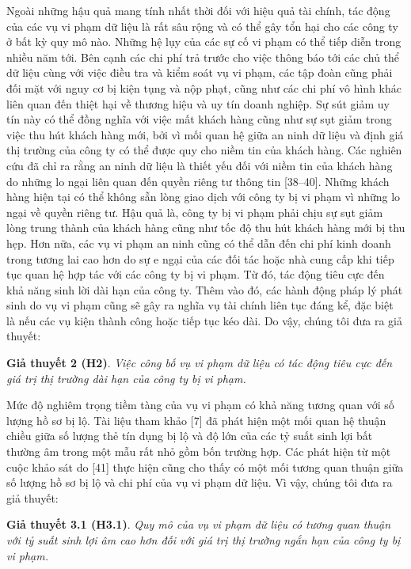Ngoài những hậu quả mang tính nhất thời đối với hiệu quả tài chính, tác động của các vụ vi phạm dữ liệu là rất sâu rộng và có thể gây tổn hại cho các công ty ở bất kỳ quy mô nào. Những hệ lụy của các sự cố vi phạm có thể tiếp diễn trong nhiều năm tới. Bên cạnh các chi phí trả trước cho việc thông báo tới các chủ thể dữ liệu cùng với việc điều tra và kiểm soát vụ vi phạm, các tập đoàn cũng phải đối mặt với nguy cơ bị kiện tụng và nộp phạt, cũng như các chi phí vô hình khác liên quan đến thiệt hại về thương hiệu và uy tín doanh nghiệp. Sự sút giảm uy tín này có thể đồng nghĩa với việc mất khách hàng cũng như sự sụt giảm trong việc thu hút khách hàng mới, bởi vì mối quan hệ giữa an ninh dữ liệu và định giá thị trường của công ty có thể được quy cho niềm tin của khách hàng. Các nghiên cứu đã chỉ ra rằng an ninh dữ liệu là thiết yếu đối với niềm tin của khách hàng do những lo ngại liên quan đến quyền riêng tư thông tin [38--40]. Những khách hàng hiện tại có thể không sẵn lòng giao dịch với công ty bị vi phạm vì những lo ngại về quyền riêng tư. Hậu quả là, công ty bị vi phạm phải chịu sự sụt giảm lòng trung thành của khách hàng cũng như tốc độ thu hút khách hàng mới bị thu hẹp. Hơn nữa, các vụ vi phạm an ninh cũng có thể dẫn đến chi phí kinh doanh trong tương lai cao hơn do sự e ngại của các đối tác hoặc nhà cung cấp khi tiếp tục quan hệ hợp tác với các công ty bị vi phạm. Từ đó, tác động tiêu cực đến khả năng sinh lời dài hạn của công ty. Thêm vào đó, các hành động pháp lý phát sinh do vụ vi phạm cũng sẽ gây ra nghĩa vụ tài chính liên tục đáng kể, đặc biệt là nếu các vụ kiện thành công hoặc tiếp tục kéo dài. Do vậy, chúng tôi đưa ra giả thuyết:

\textbf{Giả thuyết 2 (H2)}. \emph{Việc công bố vụ vi phạm dữ liệu có tác động tiêu cực đến giá trị thị trường dài hạn của công ty bị vi phạm.}

Mức độ nghiêm trọng tiềm tàng của vụ vi phạm có khả năng tương quan với số lượng hồ sơ bị lộ. Tài liệu tham khảo [7] đã phát hiện một mối quan hệ thuận chiều giữa số lượng thẻ tín dụng bị lộ và độ lớn của các tỷ suất sinh lợi bất thường âm trong một mẫu rất nhỏ gồm bốn trường hợp. Các phát hiện từ một cuộc khảo sát do [41] thực hiện cũng cho thấy có một mối tương quan thuận giữa số lượng hồ sơ bị lộ và chi phí của vụ vi phạm dữ liệu. Vì vậy, chúng tôi đưa ra giả thuyết:

\textbf{Giả thuyết 3.1 (H3.1)}. \emph{Quy mô của vụ vi phạm dữ liệu có tương quan thuận với tỷ suất sinh lợi âm cao hơn đối với giá trị thị trường ngắn hạn của công ty bị vi phạm.}

